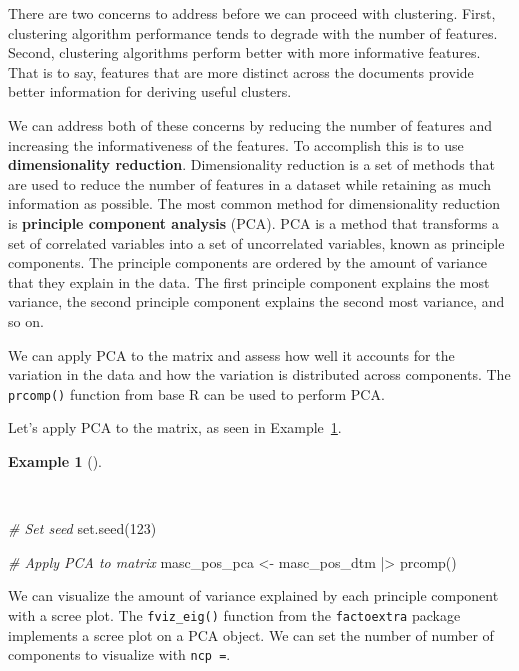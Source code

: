 \documentclass[
  letterpaper,
  DIV=11,
  numbers=noendperiod]{scrreprt}
\newenvironment{Shaded}{\begin{snugshade}}{\end{snugshade}}
\newcommand{\CommentTok}[1]{\textcolor[rgb]{0.00,0.00,0.00}{\textit{#1}}}
\newcommand{\DecValTok}[1]{\textcolor[rgb]{0.00,0.00,0.00}{#1}}
\newcommand{\FunctionTok}[1]{\textcolor[rgb]{0.00,0.00,0.00}{#1}}
\newcommand{\NormalTok}[1]{\textcolor[rgb]{0.00,0.00,0.00}{#1}}
\newcommand{\OtherTok}[1]{\textcolor[rgb]{0.00,0.00,0.00}{#1}}
\newcommand{\SpecialCharTok}[1]{\textcolor[rgb]{0.00,0.00,0.00}{#1}}
\theoremstyle{definition}
\newtheorem{example}{Example}[chapter]
\theoremstyle{remark}
\begin{document}
There are two concerns to address before we can proceed with clustering.
First, clustering algorithm performance tends to degrade with the number
of features. Second, clustering algorithms perform better with more
informative features. That is to say, features that are more distinct
across the documents provide better information for deriving useful
clusters.

We can address both of these concerns by reducing the number of features
and increasing the informativeness of the features. To accomplish this
is to use \textbf{dimensionality reduction}. Dimensionality reduction is
a set of methods that are used to reduce the number of features in a
dataset while retaining as much information as possible. The most common
method for dimensionality reduction is \textbf{principle component
analysis} (PCA). PCA is a method that transforms a set of correlated
variables into a set of uncorrelated variables, known as principle
components. The principle components are ordered by the amount of
variance that they explain in the data. The first principle component
explains the most variance, the second principle component explains the
second most variance, and so on.

We can apply PCA to the matrix and assess how well it accounts for the
variation in the data and how the variation is distributed across
components. The \texttt{prcomp()} function from base R can be used to
perform PCA.

Let's apply PCA to the matrix, as seen in
Example~\ref{exm-eda-masc-dtms-pca}.

\begin{example}[]\protect\hypertarget{exm-eda-masc-dtms-pca}{}\label{exm-eda-masc-dtms-pca}

~

\begin{Shaded}
\begin{Highlighting}[]
\CommentTok{\# Set seed}
\FunctionTok{set.seed}\NormalTok{(}\DecValTok{123}\NormalTok{)}

\CommentTok{\# Apply PCA to matrix}
\NormalTok{masc\_pos\_pca }\OtherTok{\textless{}{-}}
\NormalTok{  masc\_pos\_dtm }\SpecialCharTok{|\textgreater{}}
  \FunctionTok{prcomp}\NormalTok{()}
\end{Highlighting}
\end{Shaded}

\end{example}

We can visualize the amount of variance explained by each principle
component with a scree plot. The \texttt{fviz\_eig()} function from the
\texttt{factoextra} package implements a scree plot on a PCA object. We
can set the number of number of components to visualize with
\texttt{ncp\ =}.
\end{document}
